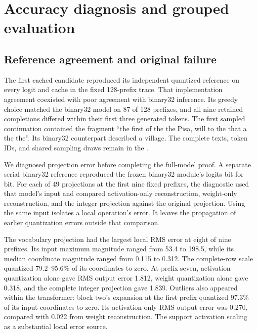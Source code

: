 \section{Accuracy diagnosis and grouped evaluation}
\label{sec:accuracy}

\subsection{Reference agreement and original failure}

The first cached candidate reproduced its independent quantized reference on every logit and cache in the fixed 128-prefix trace.  That implementation agreement coexisted with poor agreement with binary32 inference.  Its greedy choice matched the binary32 model on 87 of 128 prefixes, and all nine retained completions differed within their first three generated tokens.  The first sampled continuation contained the fragment ``the first of the the Pisa, will to the that a the the''.  Its binary32 counterpart described a village.  The complete texts, token IDs, and shared sampling draws remain in the .

We diagnosed projection error before completing the full-model proof.  A separate serial binary32 reference reproduced the frozen binary32 module's logits bit for bit.  For each of 49 projections at the first nine fixed prefixes, the diagnostic used that model's input and compared activation-only reconstruction, weight-only reconstruction, and the integer projection against the original projection.  Using the same input isolates a local operation's error.  It leaves the propagation of earlier quantization errors outside that comparison.

The vocabulary projection had the largest local RMS error at eight of nine prefixes.  Its input maximum magnitude ranged from 53.4 to 198.5, while its median coordinate magnitude ranged from 0.115 to 0.312.  The complete-row scale quantized 79.2--95.6\% of its coordinates to zero.  At prefix seven, activation quantization alone gave RMS output error 1.812, weight quantization alone gave 0.318, and the complete integer projection gave 1.839.  Outliers also appeared within the transformer: block two's expansion at the first prefix quantized 97.3\% of its input coordinates to zero.  Its activation-only RMS output error was 0.270, compared with 0.022 from weight reconstruction.  The  support activation scaling as a substantial local error source.

